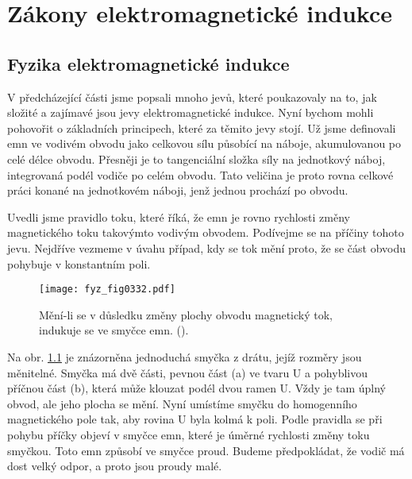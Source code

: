 \setchaptertoc
\chapter{Zákony elektromagnetické indukce}\label{fyz:IIchapXVII}


\section{Fyzika elektromagnetické indukce}\label{fyz:IIchapXVIIsecI}
  V předcházející části jsme popsali mnoho jevů, které poukazovaly na to, jak složité a zajímavé 
  jsou jevy elektromagnetické indukce. Nyní bychom mohli pohovořit o základních principech, které 
  za těmito jevy stojí. Už jsme definovali emn ve vodivém obvodu jako celkovou sílu působící na 
  náboje, akumulovanou po celé délce obvodu. Přesněji je to tangenciální složka síly na jednotkový 
  náboj, integrovaná podél vodiče po celém obvodu. Tato veličina je proto rovna celkové práci 
  konané na jednotkovém náboji, jenž jednou prochází po obvodu.
  
  Uvedli jsme pravidlo toku, které říká, že emn je rovno rychlosti změny magnetického toku 
  takovýmto vodivým obvodem. Podívejme se na příčiny tohoto jevu. Nejdříve vezmeme v úvahu případ, 
  kdy se tok mění proto, že se část obvodu pohybuje v konstantním poli.

  \begin{figure}[ht!]  %
    \centering
    \texttt{[image: fyz\_fig0332.pdf]}
    \caption{Mění-li se v důsledku změny plochy obvodu magnetický tok, indukuje se ve smyčce emn. 
             (\cite[s.~294]{Feynman02}).}
    \label{fyz:fig0332}
  \end{figure}
  
  Na obr. \ref{fyz:fig0332} je znázorněna jednoduchá smyčka z drátu, jejíž rozměry jsou měnitelné. 
  Smyčka má dvě části, pevnou část (a) ve tvaru U a pohyblivou příčnou část (b), která může klouzat 
  podél dvou ramen U. Vždy je tam úplný obvod, ale jeho plocha se mění. Nyní umístíme smyčku do 
  homogenního magnetického pole tak, aby rovina U byla kolmá k poli. Podle pravidla se při pohybu 
  příčky objeví v smyčce emn, které je úměrné rychlosti změny toku smyčkou. Toto emn způsobí ve 
  smyčce proud. Budeme předpokládat, že vodič má dost velký odpor, a proto jsou proudy malé.
  
